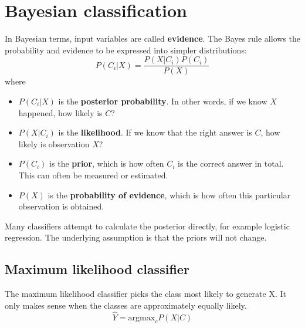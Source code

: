 \documentclass[CS5104-Notes.tex]{subfiles}
\begin{document}
\section{Bayesian classification}
In Bayesian terms, input variables are called \textbf{evidence}. The Bayes rule allows the probability and evidence to be expressed into simpler distributions:
\begin{equation}
P(C_{i} | X) = \frac{P(X|C_{i}) P(C_{i})}{P(X)}
\end{equation}
where 
\begin{itemize}
\item $P(C_{i} | X)$ is the \textbf{posterior probability}. In other words, if we know $X$ happened, how likely is $C$?
\item $P(X|C_{i})$ is the \textbf{likelihood}. If we know that the right answer is $C$, how likely is observation $X$?
\item $P(C_{i})$ is the \textbf{prior}, which is how often $C_{i}$ is the correct answer in total. This can often be measured or estimated.
\item $P(X)$ is the \textbf{probability of evidence}, which is how often this particular observation is obtained.
\end{itemize}
Many classifiers attempt to calculate the posterior directly, for example logistic regression. The underlying assumption is that the priors will not change. 
\subsection{Maximum likelihood classifier}
The maximum likelihood classifier picks the class most likely to generate X. It only makes sense when the classes are approximately equally likely.
\begin{equation}
\hat{Y} = \text{argmax}_{c}P(X|C)
\end{equation}
\end{document}
